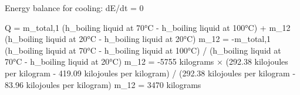 Energy balance for cooling:  
dE/dt = 0  

Q = m_total,1 (h_boiling liquid at 70°C - h_boiling liquid at 100°C) + m_12 (h_boiling liquid at 20°C - h_boiling liquid at 20°C)  
m_12 = -m_total,1 (h_boiling liquid at 70°C - h_boiling liquid at 100°C) / (h_boiling liquid at 70°C - h_boiling liquid at 20°C)  
m_12 = -5755 kilograms × (292.38 kilojoules per kilogram - 419.09 kilojoules per kilogram) / (292.38 kilojoules per kilogram - 83.96 kilojoules per kilogram)  
m_12 = 3470 kilograms